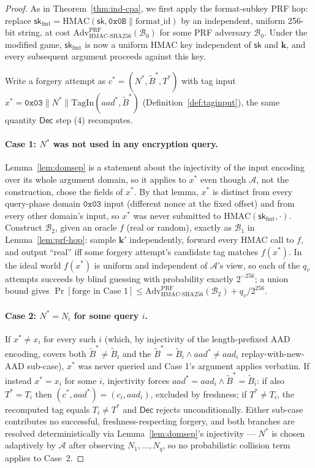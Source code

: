 \documentclass[11pt,a4paper]{article}
\begin{document}
\begin{proof}
As in Theorem~\ref{thm:ind-cpa}, we first apply the format-subkey PRF
hop: replace
$\mathsf{sk}_{\mathrm{fmt}}=\mathrm{HMAC}(\mathsf{sk},\texttt{0x0B}\|\mathrm{format\_id})$
by an independent, uniform 256-bit string, at cost
$\mathrm{Adv}^{\mathrm{PRF}}_{\mathrm{HMAC\text{-}SHA256}}(\mathcal{B}_0)$
for some PRF adversary $\mathcal{B}_0$. Under the modified game,
$\mathsf{sk}_{\mathrm{fmt}}$ is now a uniform HMAC key independent of
$\mathsf{sk}$ and $\mathbf{k}$, and every subsequent argument proceeds
against this key.

Write a forgery attempt as $c^*=(N^*,\widetilde{B}^*,T^*)$ with tag input
$x^*=\texttt{0x03}\|N^*\|\mathrm{TagIn}(aad^*,\widetilde{B}^*)$
(Definition~\ref{def:taginput}), the same quantity $\mathsf{Dec}$ step (4)
recomputes.

\paragraph{Case 1: $N^*$ was not used in any encryption query.}
Lemma~\ref{lem:domsep} is a statement about the injectivity of the input
encoding over its whole argument domain, so it applies to $x^*$ even
though $\mathcal{A}$, not the construction, chose the fields of $x^*$.
By that lemma, $x^*$ is distinct from every query-phase domain
$\texttt{0x03}$ input (different nonce at the fixed offset) and from every
other domain's input, so $x^*$ was never submitted to
$\mathrm{HMAC}(\mathsf{sk}_{\mathrm{fmt}},\cdot)$. Construct $\mathcal{B}_2$, given an
oracle $f$ (real or random), exactly as $\mathcal{B}_1$ in
Lemma~\ref{lem:prf-hop}: sample $\mathbf{k}'$ independently, forward every
HMAC call to $f$, and output ``real'' iff some forgery attempt's candidate
tag matches $f(x^*)$. In the ideal world $f(x^*)$ is uniform and
independent of $\mathcal{A}$'s view, so each of the $q_v$ attempts succeeds
by blind guessing with probability exactly $2^{-256}$; a union bound gives
$\Pr[\text{forge in Case 1}]\le\mathrm{Adv}^{\mathrm{PRF}}_{\mathrm{HMAC\text{-}SHA256}}(\mathcal{B}_2)+q_v/2^{256}$.

\paragraph{Case 2: $N^*=N_i$ for some query $i$.} If $x^*\neq x_i$ for
every such $i$ (which, by injectivity of the length-prefixed AAD encoding,
covers both $\widetilde{B}^*\neq\widetilde{B}_i$ and the
$\widetilde{B}^*=\widetilde{B}_i\wedge aad^*\neq aad_i$ replay-with-new-AAD
sub-case), $x^*$ was never queried and Case 1's argument applies verbatim.
If instead $x^*=x_i$ for some $i$, injectivity forces
$aad^*=aad_i\wedge\widetilde{B}^*=\widetilde{B}_i$: if also $T^*=T_i$ then
$(c^*,aad^*)=(c_i,aad_i)$, excluded by freshness; if $T^*\neq T_i$, the
recomputed tag equals $T_i\neq T^*$ and $\mathsf{Dec}$ rejects
unconditionally. Either sub-case contributes no successful,
freshness-respecting forgery, and both branches are resolved
deterministically via Lemma~\ref{lem:domsep}'s injectivity — $N^*$ is
chosen adaptively by $\mathcal{A}$ after observing $N_1,\ldots,N_q$, so no
probabilistic collision term applies to Case~2.


\end{proof}
\end{document}
